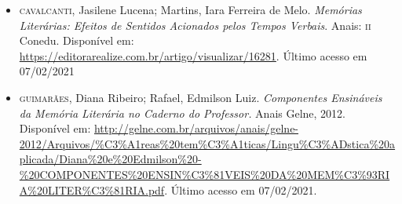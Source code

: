 \documentclass{article}
\begin{document}
\begin{itemize}
\item\textsc{cavalcanti}, Jasilene Lucena; Martins, Iara Ferreira de Melo.
\emph{Memórias Literárias: Efeitos de Sentidos Acionados pelos Tempos
Verbais}. Anais: \textsc{ii} Conedu. Disponível em:
\url{https://editorarealize.com.br/artigo/visualizar/16281}.
Último acesso em 07/02/2021

\item\textsc{guimarães}, Diana Ribeiro; Rafael, Edmilson Luiz. \emph{Componentes
Ensináveis da Memória Literária no Caderno do Professor.} Anais Gelne,
2012. Disponível em:
\url{http://gelne.com.br/arquivos/anais/gelne-2012/Arquivos/\%C3\%A1reas\%20tem\%C3\%A1ticas/Lingu\%C3\%ADstica\%20aplicada/Diana\%20e\%20Edmilson\%20-\%20COMPONENTES\%20ENSIN\%C3\%81VEIS\%20DA\%20MEM\%C3\%93RIA\%20LITER\%C3\%81RIA.pdf}. Último acesso em 07/02/2021.
\end{itemize}
\end{document}
